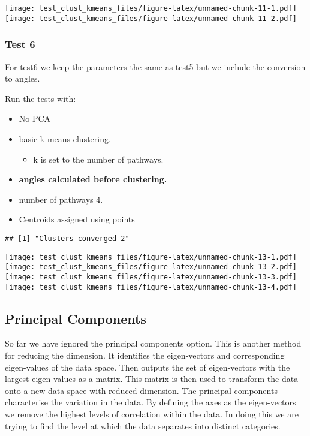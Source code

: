 \documentclass[
]{article}
\providecommand{\tightlist}{%
  \setlength{\itemsep}{0pt}\setlength{\parskip}{0pt}}
\begin{document}
\texttt{[image: test\_clust\_kmeans\_files/figure-latex/unnamed-chunk-11-1.pdf]}
\texttt{[image: test\_clust\_kmeans\_files/figure-latex/unnamed-chunk-11-2.pdf]}

\hypertarget{test6}{%
\subsubsection{Test 6}\label{test6}}

For test6 we keep the parameters the same as
\protect\hyperlink{test5}{test5} but we include the conversion to
angles.

Run the tests with:

\begin{itemize}
\tightlist
\item
  No PCA
\item
  basic k-means clustering.

  \begin{itemize}
  \tightlist
  \item
    k is set to the number of pathways.
  \end{itemize}
\item
  \textbf{angles calculated before clustering.}
\item
  number of pathways 4.
\item
  Centroids assigned using points
\end{itemize}

\begin{verbatim}
## [1] "Clusters converged 2"
\end{verbatim}

\texttt{[image: test\_clust\_kmeans\_files/figure-latex/unnamed-chunk-13-1.pdf]}
\texttt{[image: test\_clust\_kmeans\_files/figure-latex/unnamed-chunk-13-2.pdf]}
\texttt{[image: test\_clust\_kmeans\_files/figure-latex/unnamed-chunk-13-3.pdf]}
\texttt{[image: test\_clust\_kmeans\_files/figure-latex/unnamed-chunk-13-4.pdf]}

\hypertarget{pca}{%
\subsection{Principal Components}\label{pca}}

So far we have ignored the principal components option. This is another
method for reducing the dimension. It identifies the eigen-vectors and
corresponding eigen-values of the data space. Then outputs the set of
eigen-vectors with the largest eigen-values as a matrix. This matrix is
then used to transform the data onto a new data-space with reduced
dimension. The principal components characterise the variation in the
data. By defining the axes as the eigen-vectors we remove the highest
levels of correlation within the data. In doing this we are trying to
find the level at which the data separates into distinct categories.
\end{document}
